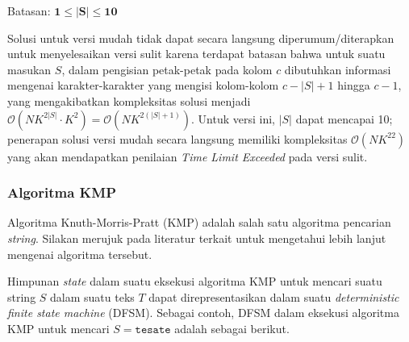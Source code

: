 \documentclass[../main_editorial.tex]{subfiles} %
\newcommand{\bigO}[1]{\mathcal{O}(#1)}
\begin{document}
Batasan: $\mathbf{1 \le |S| \le 10}$

Solusi untuk versi mudah tidak dapat secara langsung diperumum/diterapkan untuk menyelesaikan versi sulit karena terdapat batasan bahwa untuk suatu masukan $ S $, dalam pengisian petak-petak pada kolom $ c $ dibutuhkan informasi mengenai karakter-karakter yang mengisi kolom-kolom $ c-|S|+1 $ hingga $ c-1 $, yang mengakibatkan kompleksitas solusi menjadi $ \bigO{NK^{2|S|} \cdot {K^2}} = \bigO{NK^{2(|S| + 1)}} $. Untuk versi ini, $ |S| $ dapat mencapai 10; penerapan solusi versi mudah secara langsung memiliki kompleksitas $ \bigO{NK^{22}} $ yang akan mendapatkan penilaian \textit{Time Limit Exceeded} pada versi sulit.

\subsubsection*{Algoritma KMP}

Algoritma Knuth-Morris-Pratt (KMP) adalah salah satu algoritma pencarian \textit{string}. Silakan merujuk pada literatur terkait untuk mengetahui lebih lanjut mengenai algoritma tersebut.

Himpunan \textit{state} dalam suatu eksekusi algoritma KMP untuk mencari suatu string $ S $ dalam suatu teks $ T $ dapat direpresentasikan dalam suatu \textit{deterministic finite state machine} (DFSM). Sebagai contoh, DFSM dalam eksekusi algoritma KMP untuk mencari $ S =\texttt{tesate} $ adalah sebagai berikut.

\begin{center}
\end{center}
\end{document}
